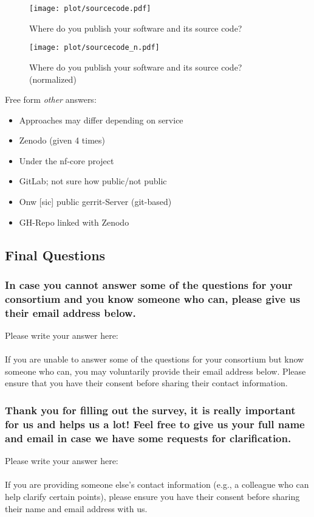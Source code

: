 \documentclass[headsepline,titlepage,twoside,12pt,toc=flat,headings=normal]{scrreprt}
\newcommand{\question}[1]{\subsubsection{#1}}
\newcommand{\otherbox}{\fbox{\phantom{This is how big an answer would be.}}}
\begin{document}
\begin{figure}[h!]
\caption{Where do you publish your software and its source code?}
\label{fig:sourcecode}
\texttt{[image: plot/sourcecode.pdf]}
\end{figure}

\begin{figure}[h!]
\caption{Where do you publish your software and its source code? (normalized)}
\label{fig:sourcecode_n}
\texttt{[image: plot/sourcecode\_n.pdf]}
\end{figure}

Free form \emph{other} answers:
\begin{itemize}
\item Approaches may differ depending on service
\item Zenodo (given 4 times)
\item Under the nf-core project
\item GitLab; not sure how public/not public
\item Onw [sic] public gerrit-Server (git-based)
\item GH-Repo linked with Zenodo
\end{itemize}

\subsection{Final Questions}\label{final-questions}

\question{In case you cannot answer some of the questions for your consortium and you know someone who can, please give us their email address below.}

Please write your answer here: \otherbox

\paragraph{}
If you are unable to answer some of the questions for your consortium but know someone who can, you may voluntarily provide their email address below.
Please ensure that you have their consent before sharing their contact information.

\question{Thank you for filling out the survey, it is really important for us and helps us a lot! Feel free to give us your full name and email in case we have some requests for clarification.}
Please write your answer here: \otherbox

\paragraph{}
If you are providing someone else's contact information (e.g., a colleague who can help clarify certain points), please ensure you have their consent before sharing their name and email address with us.
\end{document}
